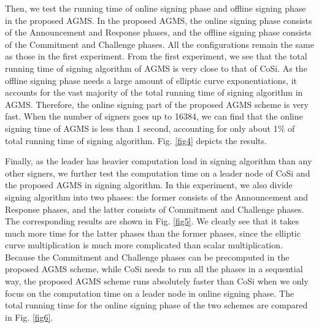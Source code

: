\documentclass[journal]{IEEEtran}
\begin{document}
Then, we test the running time of online signing phase and offline signing phase in the proposed AGMS. In the proposed AGMS, the online signing phase consists of the Announcement and Response phases, and the offline signing phase consists of the Commitment and Challenge phases. All the configurations remain the same as those in the first experiment. From the first experiment, we see that the total running time of signing algorithm of AGMS is very close to that of CoSi. As the offline signing phase needs a large amount of elliptic curve exponentiations, it accounts for the vast majority of the total running time of signing algorithm in AGMS. Therefore, the online signing part of the proposed AGMS scheme is very fast. When the number of signers goes up to 16384, we can find that the online signing time of AGMS is less than 1 second, accounting for only about 1\% of total running time of signing algorithm. Fig. \ref{fig4} depicts the results.

Finally, as the leader has heavier computation load in signing algorithm than any other signers, we further test the computation time on a leader node of CoSi and the proposed AGMS in signing algorithm. In this experiment, we also divide signing algorithm into two phases: the former consists of the Announcement and Response phases, and the latter consists of Commitment and Challenge phases. The corresponding results are shown in Fig. \ref{fig5}. We clearly see that it takes much more time for the latter phases than the former phases, since the elliptic curve multiplication is much more complicated than scalar multiplication. Because the Commitment and Challenge phases can be precomputed in the proposed AGMS scheme, while CoSi needs to run all the phases in a sequential way, the proposed AGMS scheme runs absolutely faster than CoSi when we only focus on the computation time on a leader node in online signing phase. The total running time for the online signing phase of the two schemes are compared in Fig. \ref{fig6}.
\end{document}
